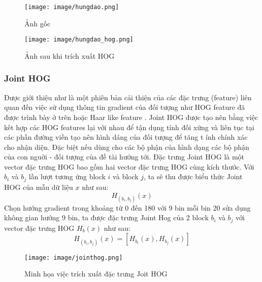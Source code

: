 \documentclass[12pt,a4paper]{article}
\begin{document}
\begin{figure}[!htb]
   \begin{minipage}{0.5\textwidth}
     \centering
     \texttt{[image: image/hungdao.png]}
     \caption{Ảnh gốc \label{Fig:hog_ori}}
   \end{minipage}
   \begin{minipage}{0.5\textwidth}
     \centering
     \texttt{[image: image/hungdao\_hog.png]}
     \caption{Ảnh sau khi trích xuất HOG \label{Fig:Hog_extract}}
   \end{minipage}
\end{figure}


\subsubsection{Joint HOG}
Được giới thiệu như là một phiên bản cải thiện của các đặc trưng (feature) liên quan đến việc sử dụng thông tin gradient của đối tượng như HOG feature đã được trình bày ở trên hoặc Haar like feature \cite{Robusts Face Detetion}. Joint HOG được tạo nên bằng việc kết hợp các HOG features lại với nhau để tận dụng tính đối xứng và liên tục tại các phần đường viền tạo nên hình dáng của đối tượng để tăng t
ính chính xác cho nhận diện. Đặc biệt nếu dùng cho các bộ phận của hình dạng các bộ phận của con nguời - đối tượng của đề tài hướng tới. Đặc trưng Joint HOG là một vector đặc trưng HOG bao gồm hai vector đặc trưng HOG cùng kích thước. Với $b_i$ và $b_j$ lần lượt tương ứng block $i$ và block $j$, ta sẽ thu được biểu thức Joint HOG của mẫu dữ liệu $x$ như sau:
\begin{equation}
    H_{(b_i, b_j)}(x)
\end{equation}
Chọn hướng gradient trong khoảng từ 0 đến 180 \degree với 9 bin mỗi bin 20 \degree sửa dụng không gian hướng 9 bin, ta được đặc trưng Joint Hog của 2 block $b_i$ và $b_j$ với vector đặc trưng HOG $H_b(x)$ như sau:
\begin{equation}
    H_{(b_i, b_j)}(x) = [H_{b_i}(x), H_{b_j}(x)]
\end{equation}
		          \begin{figure}[H]
                    \centering
                    \texttt{[image: image/jointhog.png]}
                    \caption{Minh họa việc trích xuất đặc trưng Joit HOG \cite{Head-shoulder}}
                    \label{fig:my_label}
                \end{figure}
\end{document}
